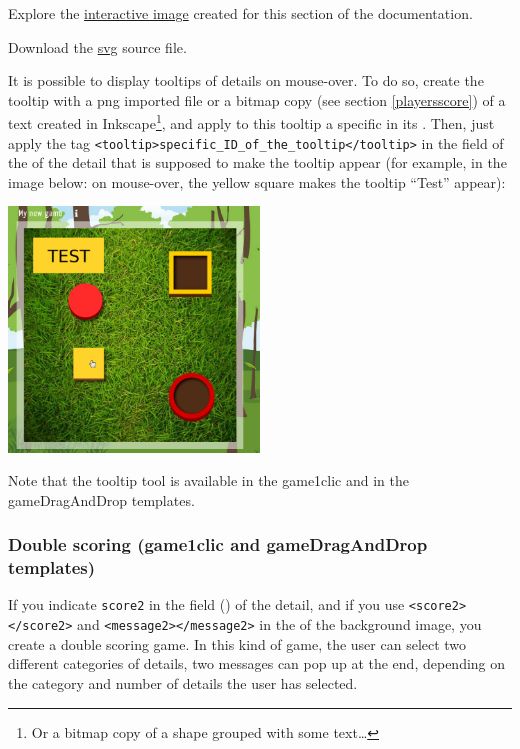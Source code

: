 \begin{links}
Explore the \href{http://xia.dane.ac-versailles.fr/demo/tuto/xia7}{interactive image}
created for this section of the documentation.

Download the \href{http://xia.dane.ac-versailles.fr/demo/tuto/xia7/svg/xia7.svg}{svg} source file.
\end{links}

It is possible to display tooltips of details on mouse-over. To do so, 
create the tooltip with a png imported file or a bitmap copy (see section \ref{playersscore})
of a text created in 
Inkscape\footnote{Or a bitmap copy of a shape grouped with some text\ldots}, and 
apply to this tooltip a specific  in its . Then, 
just apply the tag \verb|<tooltip>specific_ID_of_the_tooltip</tooltip>| in the 
 field of the  of the detail that is supposed 
to make the tooltip appear (for example, in the image below: on mouse-over, the
yellow square makes the tooltip ``Test'' appear):\\


\begin{center}
 \includegraphics[width=0.5\textwidth]{images/tooltip_example}\\
 \end{center}

Note that the tooltip tool is available in the game1clic and in the gameDragAndDrop templates.\\
 

\subsubsection{Double scoring (game1clic and gameDragAndDrop templates)}

If you indicate \verb|score2| in the  field
() of the detail,
and if you use \texttt{<score2></score2>} and  \texttt{<message2></message2>} 
in the  of the 
background image, you create a double scoring game. In this kind of game, the
user can select two different categories of details, 
two messages can pop up at the end, depending on the category and number
of details the user has selected.

